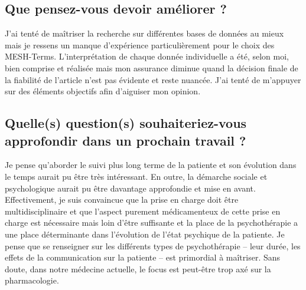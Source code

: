 \subsection{Que pensez-vous devoir améliorer ?}
J’ai tenté de maîtriser la recherche sur différentes bases de données au mieux mais je ressens un manque d’expérience particulièrement pour le choix des MESH-Terms. L’interprétation de chaque donnée individuelle a été, selon moi, bien comprise et réalisée mais mon assurance diminue quand la décision finale de la fiabilité de l’article n’est pas évidente et reste nuancée. J'ai tenté de m’appuyer sur des éléments objectifs afin d’aiguiser mon opinion.  

\subsection{Quelle(s) question(s) souhaiteriez-vous approfondir dans un prochain travail ?}
Je pense qu’aborder le suivi plus long terme de la patiente et son évolution dans le temps aurait pu être très intéressant. En outre, la démarche sociale et psychologique aurait pu être davantage approfondie et mise en avant. Effectivement, je suis convaincue que la prise en charge doit être multidisciplinaire et que l’aspect purement médicamenteux de cette prise en charge est nécessaire mais loin d'être suffisante et la place de la psychothérapie a une place déterminante dans l’évolution de l’état psychique de la patiente. Je pense que se renseigner sur les différents types de psychothérapie -- leur durée, les effets de la communication sur la patiente -- est primordial à maîtriser. Sans doute, dans notre médecine actuelle, le focus est peut-être trop axé sur la pharmacologie. 